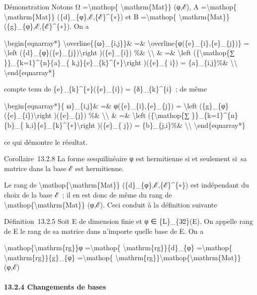 \documentclass[]{article}
\begin{document}
Démonstration Notons Ω =\textbackslash{}mathop\{
\textbackslash{}mathrm\{Mat\}\} (φ,ℰ), A =\textbackslash{}mathop\{
\textbackslash{}mathrm\{Mat\}\} (\{d\}\_\{φ\},ℰ,\{ℰ\}\^{}\{∗\}) et B
=\textbackslash{}mathop\{ \textbackslash{}mathrm\{Mat\}\}
(\{g\}\_\{φ\},ℰ,\{ℰ\}\^{}\{∗\}). On a

\textbackslash{}begin\{eqnarray*\}
\textbackslash{}overline\{\{ω\}\_\{i,j\}\}\& =\&
\textbackslash{}overline\{φ(\{e\}\_\{i\},\{e\}\_\{j\})\} =
\textbackslash{}left (\{d\}\_\{φ\}(\{e\}\_\{j\})\textbackslash{}right
)(\{e\}\_\{i\}) \%\& \textbackslash{}\textbackslash{} \& =\&
\textbackslash{}left (\{\textbackslash{}mathop\{∑
\}\}\_\{k=1\}\^{}\{n\}\{a\}\_\{
k,j\}\{e\}\_\{k\}\^{}\{∗\}\textbackslash{}right )(\{e\}\_\{ i\}) =
\{a\}\_\{i,j\}\%\& \textbackslash{}\textbackslash{}
\textbackslash{}end\{eqnarray*\}

compte tenu de \{e\}\_\{k\}\^{}\{∗\}(\{e\}\_\{i\}) =
\{δ\}\_\{k\}\^{}\{i\}~; de même

\textbackslash{}begin\{eqnarray*\}\{ ω\}\_\{i,j\}\& =\&
φ(\{e\}\_\{i\},\{e\}\_\{j\}) = \textbackslash{}left
(\{g\}\_\{φ\}(\{e\}\_\{i\})\textbackslash{}right )(\{e\}\_\{j\}) \%\&
\textbackslash{}\textbackslash{} \& =\& \textbackslash{}left
(\{\textbackslash{}mathop\{∑ \}\}\_\{k=1\}\^{}\{n\}\{b\}\_\{
k,i\}\{e\}\_\{k\}\^{}\{∗\}\textbackslash{}right )(\{e\}\_\{ j\}) =
\{b\}\_\{j,i\}\%\& \textbackslash{}\textbackslash{}
\textbackslash{}end\{eqnarray*\}

ce qui démontre le résultat.

Corollaire~13.2.8 La forme sesquilinéaire φ est hermitienne si et
seulement si~sa matrice dans la base ℰ est hermitienne.

Le rang de \textbackslash{}mathop\{\textbackslash{}mathrm\{Mat\}\}
(\{d\}\_\{φ\},ℰ,\{ℰ\}\^{}\{∗\}) est indépendant du choix de la base ℰ~;
il en est donc de même du rang de
\textbackslash{}mathop\{\textbackslash{}mathrm\{Mat\}\} (φ,ℰ). Ceci
conduit à la définition suivante

Définition~13.2.5 Soit E de dimension finie et φ ∈ \{L\}\_\{3∕2\}(E). On
appelle rang de E le rang de sa matrice dans n'importe quelle base de E.
On a

\textbackslash{}mathop\{\textbackslash{}mathrm\{rg\}\}φ
=\textbackslash{}mathop\{ \textbackslash{}mathrm\{rg\}\}\{d\}\_\{φ\}
=\textbackslash{}mathop\{ \textbackslash{}mathrm\{rg\}\}\{g\}\_\{φ\}
=\textbackslash{}mathop\{
\textbackslash{}mathrm\{rg\}\}\textbackslash{}mathop\{\textbackslash{}mathrm\{Mat\}\}
(φ,ℰ)

\paragraph{13.2.4 Changements de bases}
\end{document}
